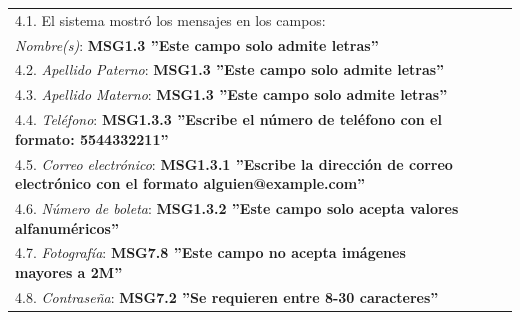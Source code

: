 \documentclass[oneside,10pt]{book}
\begin{document}
\begin{tabularx}{\textwidth}{ X l l X }
\multicolumn{1}{|X|}{4.1. El sistema mostró los mensajes en los campos:} & \multicolumn{1}{l|}{}   & \multicolumn{1}{l|}{}   & \multicolumn{1}{X|}{}              \\
\multicolumn{1}{|X|}{\textit{Nombre(s)}: \textbf{MSG1.3 ''Este campo solo admite letras''}} & \multicolumn{1}{l|}{}   & \multicolumn{1}{l|}{}   & \multicolumn{1}{X|}{}              \\ \hline
\multicolumn{1}{|X|}{4.2. \textit{Apellido Paterno}: \textbf{MSG1.3 ''Este campo solo admite letras''}} & \multicolumn{1}{l|}{}   & \multicolumn{1}{l|}{}   & \multicolumn{1}{X|}{}              \\ \hline
\multicolumn{1}{|X|}{4.3. \textit{Apellido Materno}: \textbf{MSG1.3 ''Este campo solo admite letras''}} & \multicolumn{1}{l|}{}   & \multicolumn{1}{l|}{}   & \multicolumn{1}{X|}{}              \\ \hline
\multicolumn{1}{|X|}{4.4. \textit{Teléfono}: \textbf{MSG1.3.3 ''Escribe el número de teléfono con el formato: 5544332211''}} & \multicolumn{1}{l|}{}   & \multicolumn{1}{l|}{}   & \multicolumn{1}{X|}{}              \\ \hline
\multicolumn{1}{|X|}{4.5. \textit{Correo electrónico}: \textbf{MSG1.3.1 ''Escribe la dirección de correo electrónico con el formato alguien@example.com''}} & \multicolumn{1}{l|}{}   & \multicolumn{1}{l|}{}   & \multicolumn{1}{X|}{}              \\ \hline
\multicolumn{1}{|X|}{4.6. \textit{Número de boleta}: \textbf{MSG1.3.2 ''Este campo solo acepta valores alfanuméricos''}} & \multicolumn{1}{l|}{}   & \multicolumn{1}{l|}{}   & \multicolumn{1}{X|}{}              \\ \hline
\multicolumn{1}{|X|}{4.7. \textit{Fotografía}: \textbf{MSG7.8 ''Este campo no acepta imágenes mayores a 2M''}} & \multicolumn{1}{l|}{}   & \multicolumn{1}{l|}{}   & \multicolumn{1}{X|}{}              \\ \hline
\multicolumn{1}{|X|}{4.8. \textit{Contraseña}: \textbf{MSG7.2 ''Se requieren entre 8-30 caracteres''}} & \multicolumn{1}{l|}{}   & \multicolumn{1}{l|}{}   & \multicolumn{1}{X|}{}              \\ \hline

\end{tabularx}
\end{document}
